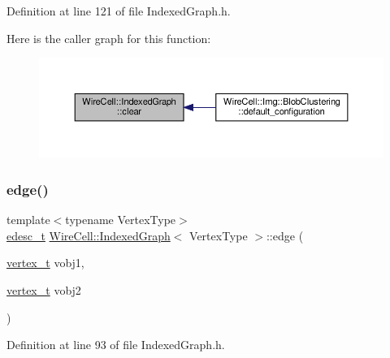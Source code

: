Definition at line 121 of file Indexed\+Graph.\+h.

Here is the caller graph for this function\+:
\nopagebreak
\begin{figure}[H]
\begin{center}
\leavevmode
\includegraphics[width=350pt]{class_wire_cell_1_1_indexed_graph_adb8836f8e4ccae7a86b062a47dedb0a3_icgraph}
\end{center}
\end{figure}
\mbox{\label{class_wire_cell_1_1_indexed_graph_a03a0f192232d913bfb4171fc7b2e095a}} 
\subsubsection{\texorpdfstring{edge()}{edge()}}
{\footnotesize\ttfamily template$<$typename Vertex\+Type$>$ \\
\hyperlink{class_wire_cell_1_1_indexed_graph_a7dabdef2dec280294d6ead6f0fdc66c8}{edesc\+\_\+t} \hyperlink{class_wire_cell_1_1_indexed_graph}{Wire\+Cell\+::\+Indexed\+Graph}$<$ Vertex\+Type $>$\+::edge (\begin{DoxyParamCaption}\item[{\hyperlink{class_wire_cell_1_1_indexed_graph_ac26b25ac103373dde929a982d948d1b5}{vertex\+\_\+t}}]{vobj1,  }\item[{\hyperlink{class_wire_cell_1_1_indexed_graph_ac26b25ac103373dde929a982d948d1b5}{vertex\+\_\+t}}]{vobj2 }\end{DoxyParamCaption})\hspace{0.3cm}{\ttfamily [inline]}}



Definition at line 93 of file Indexed\+Graph.\+h.

